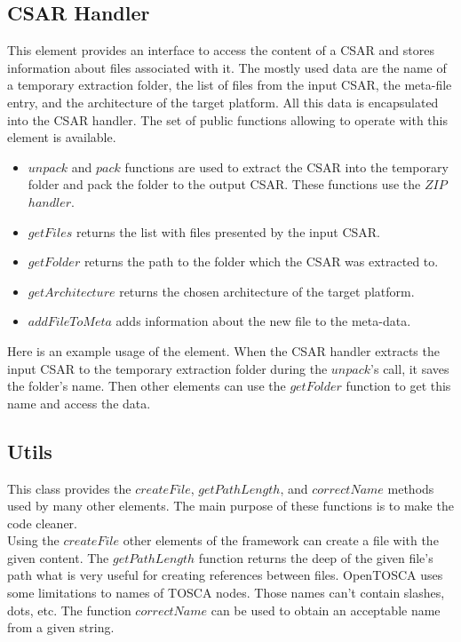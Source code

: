 \subsection*{CSAR Handler}
This element provides an interface to access the content of a CSAR and stores information about files associated with it.
The mostly used data are the name of a temporary extraction folder, the list of files from the input CSAR, the meta-file entry, and the architecture of the target platform.
All this data is encapsulated into the CSAR handler.
The set of public functions allowing to operate with this element is available.
\begin{itemize}
	\item $unpack$ and $pack$ functions are used to extract the CSAR into the temporary folder and pack the folder to the output CSAR. 
	These functions use the $ZIP$~$handler$.
	\item $getFiles$ returns the list with files presented by the input CSAR.
	\item $getFolder$ returns the path to the folder which the CSAR was extracted to.
	\item $getArchitecture$ returns the chosen architecture of the target platform.
	\item $addFileToMeta$ adds information about the new file to the meta-data.
\end{itemize}
Here is an example usage of the element.
When the CSAR handler extracts the input CSAR to the temporary extraction folder during the $unpack$'s call, it saves the folder's name. 
Then other elements can use the $getFolder$ function to get this name and access the data.

\subsection*{Utils}
This class provides the $createFile$, $getPathLength$, and $correctName$ methods used by many other elements.
The main purpose of these functions is to make the code cleaner. \\
Using the $createFile$ other elements of the framework can create a file with the given content.
The $getPathLength$ function returns the deep of the given file's path what is very useful for creating references between files. %
OpenTOSCA uses some limitations to names of TOSCA nodes. 
Those names can't contain slashes, dots, etc.
The function $correctName$ can be used to obtain an acceptable name from a given string.

